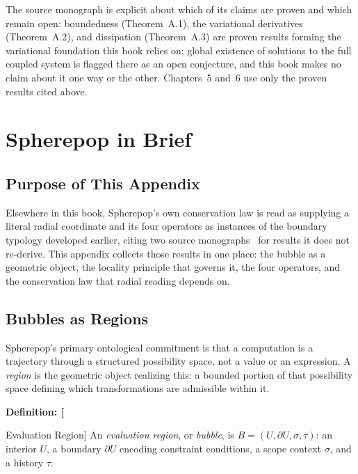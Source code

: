 \documentclass[11pt,fleqn]{book}
\numberwithin{equation}{chapter}
\newenvironment{definition}[1]
  {\begin{definitionEnv}
   \noindent\textbf{Definition: #1}\par\smallskip}
  {\end{definitionEnv}}
\theoremstyle{plain}
\theoremstyle{definition}
\theoremstyle{remark}
\begin{document}
The source monograph is explicit about which of its claims are proven and which remain open: boundedness (Theorem~A.1), the variational derivatives (Theorem~A.2), and dissipation (Theorem~A.3) are proven results forming the variational foundation this book relies on; global existence of solutions to the full coupled system is flagged there as an open conjecture, and this book makes no claim about it one way or the other. Chapters~5 and~6 use only the proven results cited above.



\chapter{Spherepop in Brief}

\section{Purpose of This Appendix}

Elsewhere in this book, Spherepop's own conservation law is read as supplying a literal radial coordinate and its four operators as instances of the boundary typology developed earlier, citing two source monographs~\cite{spherepop-geometry,spherepop-histories} for results it does not re-derive. This appendix collects those results in one place: the bubble as a geometric object, the locality principle that governs it, the four operators, and the conservation law that radial reading depends on.

\section{Bubbles as Regions}

Spherepop's primary ontological commitment is that a computation is a trajectory through a structured possibility space, not a value or an expression. A \emph{region} is the geometric object realizing this: a bounded portion of that possibility space defining which transformations are admissible within it.

\begin{definition}[Evaluation Region]
An \emph{evaluation region}, or \emph{bubble}, is \(B=(U,\partial U,\sigma,\tau)\): an interior \(U\), a boundary \(\partial U\) encoding constraint conditions, a scope context \(\sigma\), and a history \(\tau\).
\end{definition}
\end{document}

